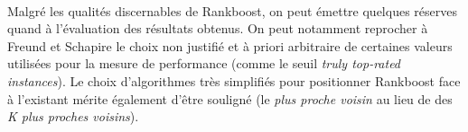 \documentclass[pdftex,a4paper,11pt]{article}
\begin{document}
\paragraph{}
Malgré les qualités discernables de Rankboost, on peut émettre quelques réserves quand à l'évaluation des résultats obtenus.
On peut notamment reprocher à Freund et Schapire le choix non justifié et à priori arbitraire de certaines valeurs utilisées pour la mesure de performance (comme le seuil \emph{truly top-rated instances}). Le choix d'algorithmes très simplifiés pour positionner Rankboost face à l'existant mérite également d'être souligné (le \emph{plus proche voisin} au lieu de des \emph{K plus proches voisins}).


%


\end{document}

